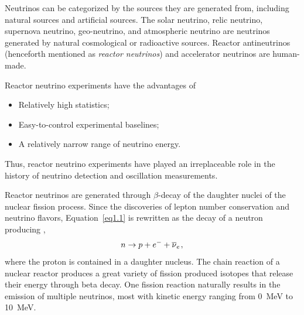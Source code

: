 \label{Ch2}

    Neutrinos can be categorized by the sources they are generated from, including natural sources and artificial sources.
    The solar neutrino, relic neutrino, supernova neutrino, geo-neutrino, and atmospheric neutrino are neutrinos generated by natural cosmological or radioactive sources.
    Reactor antineutrinos (henceforth mentioned as \textit{reactor neutrinos}) and accelerator neutrinos are human-made.
    
    Reactor neutrino experiments have the advantages of
    \begin{itemize}
        \item Relatively high statistics;
        \item Easy-to-control experimental baselines;
        \item A relatively narrow range of neutrino energy.
    \end{itemize}
    Thus, reactor neutrino experiments have played an irreplaceable role in the history of neutrino detection and oscillation measurements.
    
    
    Reactor neutrinos are \nuebar generated through $\beta$-decay of the daughter nuclei of the nuclear fission process.
    Since the discoveries of lepton number conservation and neutrino flavors, Equation~\ref{eq1.1} is rewritten as the decay of a neutron producing \nuebar,
    \begin{equation}\label{eq2.1}
        n \rightarrow p + e^- + \overline{\nu }_{e}\hspace{1pt},
    \end{equation}
    where the proton is contained in a daughter nucleus.
    The chain reaction of a nuclear reactor produces a great variety of fission produced isotopes that release their energy through beta decay.
    One fission reaction naturally results in the emission of multiple neutrinos, most with kinetic energy ranging from  0~MeV to 10~MeV.
    
